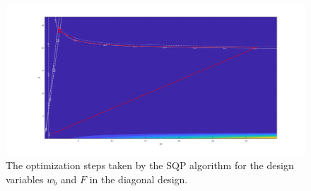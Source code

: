 \begin{figure}[H]
	\centering
	\includegraphics[width=\columnwidth]{sources/plots/straight2var.png}
	\caption{The optimization steps taken by the SQP algorithm for the design variables $w_b$ and $F$ in the diagonal design.}
	\label{fig:diagopt}
\end{figure}








